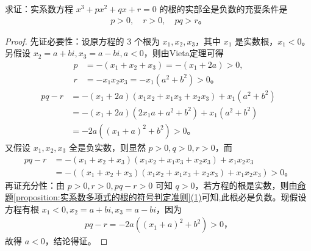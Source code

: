 \documentclass[../../main.tex]{subfiles}%
\begin{document}
\begin{example}
求证：实系数方程 $x^3 + px^2 + qx + r = 0$ 的根的实部全是负数的充要条件是
\begin{align*}
p > 0, \quad r > 0, \quad pq > r。
\end{align*}
\end{example}
\begin{proof}
先证必要性：设原方程的 3 个根为 $x_1, x_2, x_3$，其中 $x_1$ 是实数根，$x_1 < 0$。另假设 $x_2 = a + bi, x_3 = a - bi, a < 0$，则由Vieta定理可得
\begin{align*}
p &= -(x_1 + x_2 + x_3) = -(x_1 + 2a) > 0, \\
r &= -x_1 x_2 x_3 = -x_1(a^2 + b^2) > 0。
\end{align*}
\begin{align*}
pq - r &= -(x_1 + 2a)(x_1 x_2 + x_1 x_3 + x_2 x_3) + x_1(a^2 + b^2) \\
&= -(x_1 + 2a)(2x_1 a + a^2 + b^2) + x_1(a^2 + b^2) \\
&= -2a((x_1 + a)^2 + b^2) > 0。
\end{align*}
又假设 $x_1, x_2, x_3$ 全是负实数，则显然 $p > 0, q > 0, r > 0$，而
\begin{align*}
pq - r &= -(x_1 + x_2 + x_3)(x_1 x_2 + x_1 x_3 + x_2 x_3) + x_1 x_2 x_3 \\
&= -((x_1 + x_2 + x_3)(x_1 x_2 + x_1 x_3 + x_2 x_3) + x_1 x_2 x_3) > 0。
\end{align*}
再证充分性：由 $p > 0, r > 0, pq - r > 0$ 可知 $q > 0$，若方程的根是实数，则由\hyperref[proposition:实系数多项式的根的符号判定准则]{命题\ref{proposition:实系数多项式的根的符号判定准则}(1)}可知,此根必是负数。现假设方程有根 $x_1 < 0, x_2 = a + bi, x_3 = a - bi$，因为
\begin{align*}
pq - r = -2a((x_1 + a)^2 + b^2) > 0，
\end{align*}
故得 $a < 0$，结论得证。
\end{proof}
\end{document}
